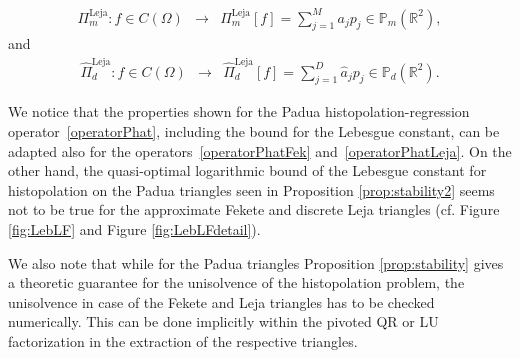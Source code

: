 \documentclass{svjour3}
\begin{document}
\begin{equation*}\label{operatorinterpLeja}
\begin{array}{rcl}
{\Pi}^{\mathrm{Leja}}_{m}: f \in C\left(\Omega\right) &\rightarrow& {\Pi}^{\mathrm{Leja}}_{m}[f] = \sum\limits_{j=1}^{M}a_j p_j\in \mathbb{P}_m\left(\mathbb{R}^2\right),
\end{array}
\end{equation*}
and
\begin{equation}\label{operatorPhatLeja}
\begin{array}{rcl}
\hat{\Pi}^{\mathrm{Leja}}_{d}: f\in C\left(\Omega\right) &\rightarrow& \hat{\Pi}^{\mathrm{Leja}}_{d}[f]=\sum\limits_{j=1}^{D} \hat{a}_j p_j \in \mathbb{P}_d\left(\mathbb{R}^2\right). 
\end{array}
\end{equation}

We notice that the properties shown for the Padua histopolation-regression operator~\eqref{operatorPhat}, including the bound for the Lebesgue constant, can be adapted also for the operators~\eqref{operatorPhatFek} and~\eqref{operatorPhatLeja}. On the other hand, the quasi-optimal logarithmic bound of the Lebesgue constant for histopolation on the Padua triangles seen in Proposition \ref{prop:stability2} seems not to be true for the approximate Fekete and discrete Leja triangles (cf. Figure \ref{fig:LebLF} and Figure \ref{fig:LebLFdetail}).  

We also note that while for the Padua triangles Proposition \ref{prop:stability} gives a theoretic guarantee for the unisolvence of the histopolation problem, the unisolvence in case of the Fekete and Leja triangles has to be checked numerically. This can be done implicitly within the pivoted QR or LU factorization in the extraction of the respective triangles. 
\end{document}

